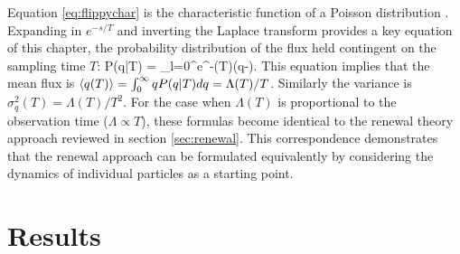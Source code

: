 Equation \ref{eq:flippychar} is the characteristic function of a Poisson distribution \citep{Cox1965}.
Expanding in $e^{-s/T}$ and inverting the Laplace transform provides a key equation of this chapter, the probability distribution of the flux held contingent on the sampling time $T$:
\be P(q|T) = \sum_{l=0}^\infty {}e^{-\Lambda(T)}\delta(q-). \label{eq:flippydist}\ee
This equation implies that the mean flux is $\langle q(T) \rangle = \int_0^\infty q P(q|T) dq = \Lambda(T)/T$. Similarly the variance is $\sigma_q^2(T) = \Lambda(T)/T^2$. For the case when $\Lambda(T)$ is proportional to the observation time ($\Lambda \propto T$), these formulas become identical to the renewal theory approach reviewed in section \ref{sec:renewal}.
This correspondence demonstrates that the renewal approach can be formulated equivalently by considering the dynamics of individual particles as a starting point.

\section{Results \label{sec:res}}
